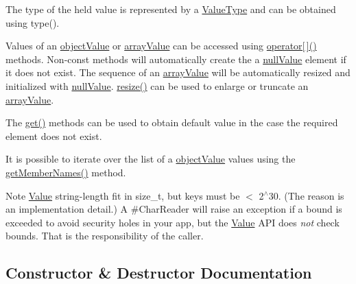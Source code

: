 The type of the held value is represented by a \hyperlink{namespace_json_a7d654b75c16a57007925868e38212b4e}{Value\+Type} and can be obtained using type().

Values of an \hyperlink{namespace_json_a7d654b75c16a57007925868e38212b4eae8386dcfc36d1ae897745f7b4f77a1f6}{object\+Value} or \hyperlink{namespace_json_a7d654b75c16a57007925868e38212b4eadc8f264f36b55b063c78126b335415f4}{array\+Value} can be accessed using \hyperlink{class_json_1_1_value_a7d99f5dba388cdaa152ce6ef933d64ef}{operator\mbox{[}$\,$\mbox{]}()} methods. Non-\/const methods will automatically create the a \hyperlink{namespace_json_a7d654b75c16a57007925868e38212b4ea7d9899633b4409bd3fc107e6737f8391}{null\+Value} element if it does not exist. The sequence of an \hyperlink{namespace_json_a7d654b75c16a57007925868e38212b4eadc8f264f36b55b063c78126b335415f4}{array\+Value} will be automatically resized and initialized with \hyperlink{namespace_json_a7d654b75c16a57007925868e38212b4ea7d9899633b4409bd3fc107e6737f8391}{null\+Value}. \hyperlink{class_json_1_1_value_aa284353271ada427dbfa04a42f2be407}{resize()} can be used to enlarge or truncate an \hyperlink{namespace_json_a7d654b75c16a57007925868e38212b4eadc8f264f36b55b063c78126b335415f4}{array\+Value}.

The \hyperlink{class_json_1_1_value_a28282c9b76fa031eba7a1843c47c16fe}{get()} methods can be used to obtain default value in the case the required element does not exist.

It is possible to iterate over the list of a \hyperlink{namespace_json_a7d654b75c16a57007925868e38212b4eae8386dcfc36d1ae897745f7b4f77a1f6}{object\+Value} values using the \hyperlink{class_json_1_1_value_a30fa08af88f2d0a038b22ba9f4e88b2a}{get\+Member\+Names()} method.

\begin{DoxyNote}{Note}
\hyperlink{class_json_1_1_value_ada6ba1369448fb0240bccc36efaa46f7}{Value} string-\/length fit in size\+\_\+t, but keys must be $<$ 2$^\wedge$30. (The reason is an implementation detail.) A \#\+Char\+Reader will raise an exception if a bound is exceeded to avoid security holes in your app, but the \hyperlink{class_json_1_1_value}{Value} A\+PI does {\itshape not} check bounds. That is the responsibility of the caller. 
\end{DoxyNote}


\subsection{Constructor \& Destructor Documentation}
